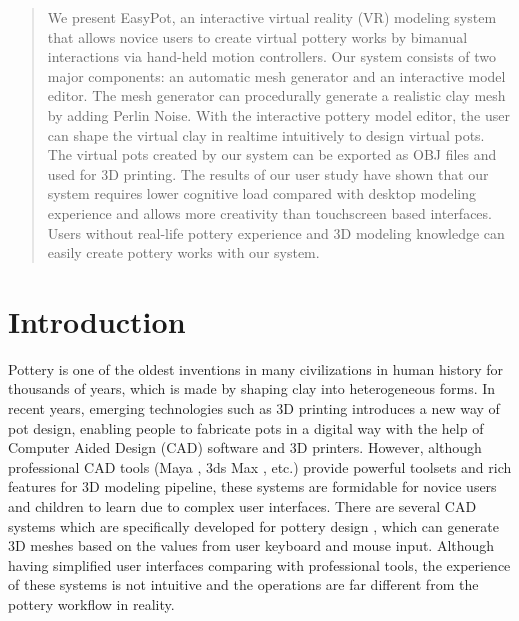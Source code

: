 \documentclass{svjour3}                     %
\begin{document}
\begin{abstract}
We present EasyPot, an interactive virtual reality (VR) modeling system that allows novice users to create virtual pottery works by bimanual interactions via hand-held motion controllers.
Our system consists of two major components: an automatic mesh generator and an interactive model editor.
The mesh generator can procedurally generate a realistic clay mesh by adding Perlin Noise. With the interactive pottery model editor, the user can shape the virtual clay in realtime intuitively to design virtual pots.
The virtual pots created by our system can be exported as OBJ files and used for 3D printing.
The results of our user study have shown that our system requires lower cognitive load compared with desktop modeling experience and allows more creativity than touchscreen based interfaces. Users without real-life pottery experience and 3D modeling knowledge can easily create pottery works with our system.

\end{abstract}


\section{Introduction}
\label{sec:1}
Pottery is one of the oldest inventions in many civilizations in human history for thousands of years, which is made by shaping clay into heterogeneous forms.
In recent years, emerging technologies such as 3D printing introduces a new way of pot design, enabling people to fabricate pots in a digital way with the help of Computer Aided Design (CAD) software and 3D printers.
However, although professional CAD tools (Maya \cite{website:maya}, 3ds Max \cite{website:3dmax}, etc.) provide powerful toolsets and rich features for 3D modeling pipeline, these systems are formidable for novice users and children to learn due to complex user interfaces.
There are several CAD systems which are specifically developed for pottery design \cite{koutsoudis2009qp,kumar2011wheel}, which can generate 3D meshes based on the values from user keyboard and mouse input. Although having simplified user interfaces comparing with professional tools, the experience of these systems is not intuitive and the operations are far different from the pottery workflow in reality.
\end{document}
